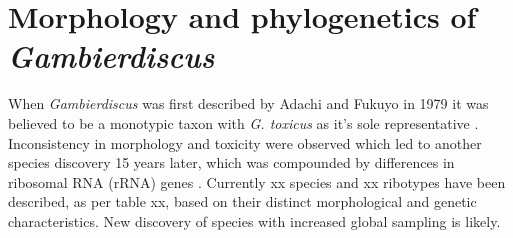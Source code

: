 \documentclass[12pt]{article}
\begin{document}
\section{Morphology and phylogenetics of \emph{Gambierdiscus}}

When \emph{Gambierdiscus} was first described by Adachi and Fukuyo in 1979 it was believed to be a monotypic taxon with \emph{G. toxicus} as it's sole representative \cite{adachi1979thecal}. Inconsistency in morphology and toxicity were observed which led to another species discovery 15 years later, which was compounded by differences in ribosomal RNA (rRNA) genes \cite{faust1995observation,holmes1990toxicity,holmes1991strain,chinain1997intraspecific,richlen2008phylogeography,bomber1988epiphytic,bomber1989epiphytism,bomber1989genitic,morton1993response}. Currently xx species and xx ribotypes have been described, as per table xx, based on their distinct morphological and genetic characteristics. New discovery of species with increased global sampling is likely. \\
\end{document}
